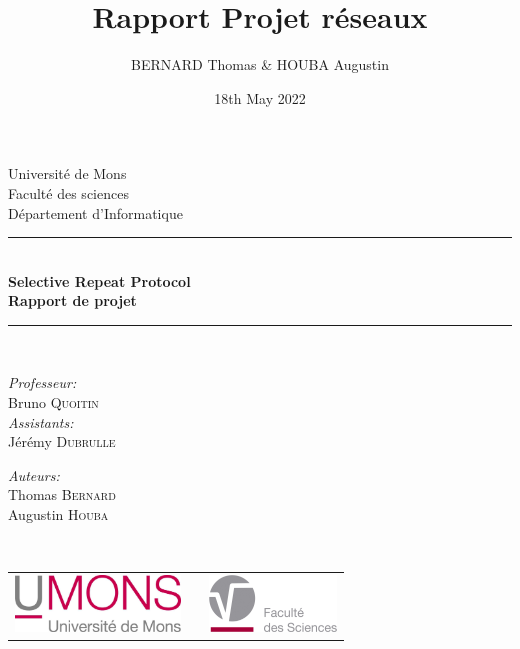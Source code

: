 \documentclass{article}
\title{Rapport Projet réseaux}
\author{BERNARD Thomas \& HOUBA Augustin}
\date{18th May 2022}
\begin{document}
\begin{titlepage}
    \begin{center}
        
        {\Large Université de Mons}\\[1ex]
        {\Large Faculté des sciences}\\[1ex]
        {\Large Département d'Informatique}\\[2.5cm]
        
        \newcommand{\HRule}{\rule{\linewidth}{0.3mm}}
        \HRule \\[0.3cm]
        { \LARGE \bfseries Selective Repeat Protocol \\[0.3cm]}
        { \LARGE \bfseries Rapport de projet \\[0.1cm]} %
        \HRule \\[1.5cm]
        
        \begin{minipage}[t]{0.45\textwidth}
            \begin{flushleft} \large
                \emph{Professeur:}\\
                Bruno \textsc{Quoitin}\\
                \emph{Assistants:}\\
                Jérémy \textsc{Dubrulle}\\
            \end{flushleft}
        \end{minipage}
        \begin{minipage}[t]{0.45\textwidth}
            \begin{flushright} \large
                \emph{Auteurs:} \\
                Thomas \textsc{Bernard} \\
                Augustin \textsc{Houba} \\
            \end{flushright}
        \end{minipage}\\[2ex]
        
        \vfill
        
        \begin{center}
            \begin{tabular}[t]{c c c}
                \includegraphics[height=1.5cm]{images/logoumons.jpg} &
                \hspace{0.3cm} &
                \includegraphics[height=1.5cm]{images/logofs.jpg}
            \end{tabular}
        \end{center}~\\
        

\end{center}
\end{titlepage}
\end{document}
